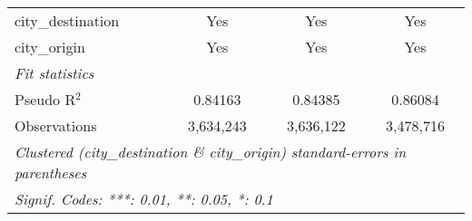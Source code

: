 \begin{tabular}{lccc}
   city\_destination                     & Yes             & Yes             & Yes\\  
   city\_origin                          & Yes             & Yes             & Yes\\  
   \midrule
   \emph{Fit statistics}\\
   Pseudo R$^2$                          & 0.84163         & 0.84385         & 0.86084\\  
   Observations                          & 3,634,243       & 3,636,122       & 3,478,716\\  
   \midrule \midrule
   \multicolumn{4}{l}{\emph{Clustered (city\_destination \& city\_origin) standard-errors in parentheses}}\\
   \multicolumn{4}{l}{\emph{Signif. Codes: ***: 0.01, **: 0.05, *: 0.1}}\\
\end{tabular}
\par\endgroup



